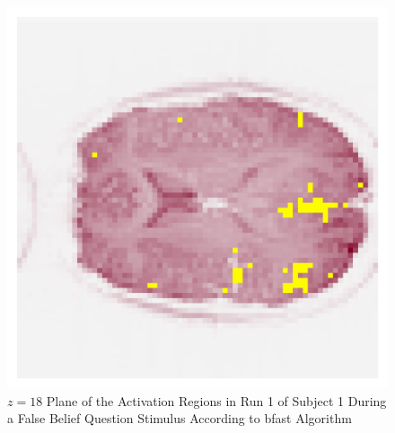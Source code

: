 \begin{figure}[htbp!]
\centering
\includegraphics{images/realDataXY.png}
\caption{$z=18$ Plane of the Activation Regions in Run 1 of Subject 1 During a False Belief Question Stimulus According to \gls{bfast} Algorithm}
\label{fig:realDataXY}
\end{figure}